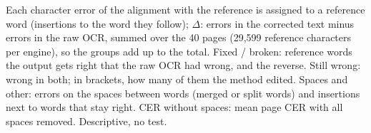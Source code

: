 \begin{table}[t]
\begin{minipage}{\linewidth}\footnotesize Each character error of the alignment with the reference is assigned to a reference word (insertions to the word they follow); $\Delta$: errors in the corrected text minus errors in the raw OCR, summed over the 40 pages (29{,}599 reference characters per engine), so the groups add up to the total. Fixed / broken: reference words the output gets right that the raw OCR had wrong, and the reverse. Still wrong: wrong in both; in brackets, how many of them the method edited. Spaces and other: errors on the spaces between words (merged or split words) and insertions next to words that stay right. CER without spaces: mean page CER with all spaces removed. Descriptive, no test.\end{minipage}
\end{table}
